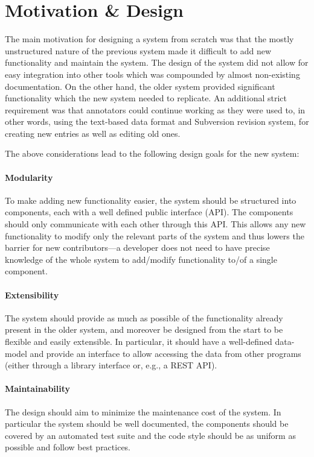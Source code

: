 \documentclass[10pt, a4paper]{article}
\begin{document}
\section{Motivation \& Design}
The main motivation for designing a system from scratch was that the mostly unstructured
nature of the previous system made it difficult to add new functionality and maintain the
system. The design of the system did not allow for easy integration into other tools which
was compounded by almost non-existing documentation. On the other hand, the older system
provided significant functionality which the new system needed to replicate. An additional
strict requirement was that annotators could continue working as they were used to,
in other words, using the text-based data format and Subversion revision system, for creating
new entries as well as editing old ones.

The above considerations lead to the following design goals for the new system:

\paragraph{Modularity} To make adding new functionality easier, the system should be structured
into components, each with a well defined public interface (API). The components should only communicate
with each other through this API. This allows any new functionality to modify only the
relevant parts of the system and thus lowers the barrier for new contributors---a developer does
not need to have precise knowledge of the whole system to add/modify functionality to/of a single component.

\paragraph{Extensibility}
The system should provide as much as possible of the functionality
already present in the older system, and moreover be designed from the start to be flexible and easily
extensible. In particular, it should have a well-defined data-model and provide an interface to allow
accessing the data from other programs (either through a library interface or, e.g., a REST API).

\paragraph{Maintainability} The design should aim to minimize the maintenance cost of the system.
In particular the system should be well documented, the components should be covered by an automated
test suite and the code style should be as uniform as possible and follow best practices.
\end{document}
